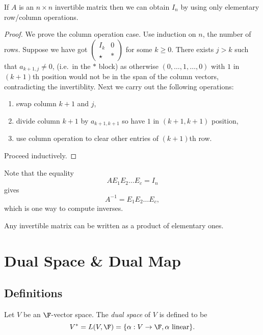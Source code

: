 \documentclass[a4paper]{article}
\theoremstyle{definition}
\begin{document}
\begin{lemma}
  If \(A\) is an \(n\times n\) invertible matrix then we can obtain \(I_n\) by using only elementary row/column operations.
\end{lemma}

\begin{proof}
  We prove the column operation case. Use induction on \(n\), the number of rows. Suppose we have got \(\begin{pmatrix} I_k & 0 \\ \star & \ast \end{pmatrix}\) for some \(k\geq 0\). There exists \(j>k\) such that \(a_{k+1,j}\neq 0\), (i.e.\ in the \(\ast\) block) as otherwise \((0,\dots,1,\dots, 0)\) with \(1\) in \((k+1)\)th position would not be in the span of the column vectors, contradicting the invertiblity. Next we carry out the following operations:
  \begin{enumerate}
  \item swap column \(k+1\) and \(j\),
  \item divide column \(k+1\) by \(a_{k + 1, k + 1}\) so have \(1\) in \((k+1,k+1)\) position,
  \item use column operation to clear other entries of \((k+1)\)th row.
  \end{enumerate}
  Proceed inductively.
\end{proof}

Note that the equality
\[
  AE_1E_2\dots E_c = I_n
\]
gives
\[
  A^{-1} = E_1E_2\dots E_c,
\]
which is one way to compute inverses.

\begin{proposition}
  Any invertible matrix can be written as a product of elementary ones.
\end{proposition}

\section{Dual Space \& Dual Map}

\subsection{Definitions}

\begin{definition}
  Let \(V\) be an \(\F\)-vector space. The \emph{dual space} of \(V\) is defined to be
  \[
    V^* = L(V,\F) = \{\alpha:V\to \F, \alpha \text{ linear}\}.
  \]
\end{definition}
\end{document}

